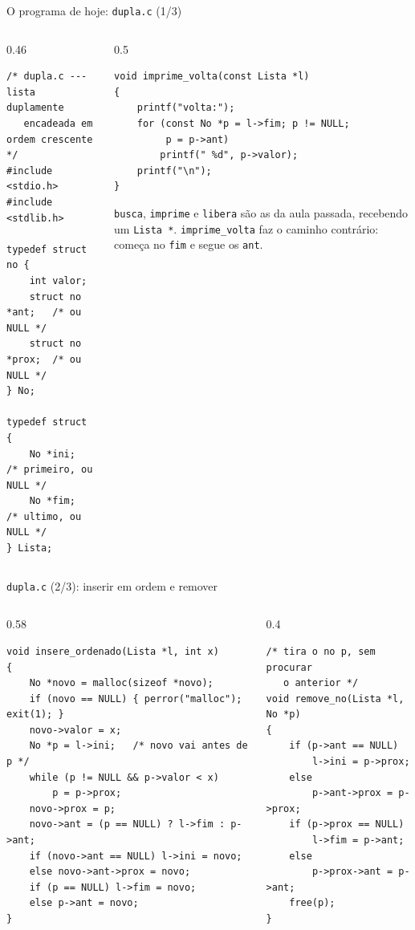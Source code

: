\documentclass[aspectratio=169]{beamer}
\begin{document}
\begin{frame}[fragile]{O programa de hoje: \texttt{dupla.c} (1/3)}
  \begin{columns}[T]
    \begin{column}{0.46\textwidth}
\begin{lstlisting}[style=codC]
/* dupla.c --- lista duplamente
   encadeada em ordem crescente */
#include <stdio.h>
#include <stdlib.h>

typedef struct no {
    int valor;
    struct no *ant;   /* ou NULL */
    struct no *prox;  /* ou NULL */
} No;

typedef struct {
    No *ini;   /* primeiro, ou NULL */
    No *fim;   /* ultimo, ou NULL */
} Lista;
\end{lstlisting}
    \end{column}
    \begin{column}{0.5\textwidth}
\begin{lstlisting}[style=codC]
void imprime_volta(const Lista *l)
{
    printf("volta:");
    for (const No *p = l->fim; p != NULL;
         p = p->ant)
        printf(" %d", p->valor);
    printf("\n");
}
\end{lstlisting}
      \small \texttt{busca}, \texttt{imprime} e \texttt{libera} são as da
      aula passada, recebendo um \texttt{Lista *}. \texttt{imprime\_volta}
      faz o caminho contrário: começa no \texttt{fim} e segue os
      \texttt{ant}.
    \end{column}
  \end{columns}
\end{frame}

\begin{frame}[fragile]{\texttt{dupla.c} (2/3): inserir em ordem e remover}
  \vspace{-0.5em}
  \begin{columns}[T]
    \begin{column}{0.58\textwidth}
\begin{lstlisting}[style=codC]
void insere_ordenado(Lista *l, int x)
{
    No *novo = malloc(sizeof *novo);
    if (novo == NULL) { perror("malloc"); exit(1); }
    novo->valor = x;
    No *p = l->ini;   /* novo vai antes de p */
    while (p != NULL && p->valor < x)
        p = p->prox;
    novo->prox = p;
    novo->ant = (p == NULL) ? l->fim : p->ant;
    if (novo->ant == NULL) l->ini = novo;
    else novo->ant->prox = novo;
    if (p == NULL) l->fim = novo;
    else p->ant = novo;
}
\end{lstlisting}
    \end{column}
    \begin{column}{0.4\textwidth}
\begin{lstlisting}[style=codC]
/* tira o no p, sem procurar
   o anterior */
void remove_no(Lista *l, No *p)
{
    if (p->ant == NULL)
        l->ini = p->prox;
    else
        p->ant->prox = p->prox;
    if (p->prox == NULL)
        l->fim = p->ant;
    else
        p->prox->ant = p->ant;
    free(p);
}
\end{lstlisting}
    \end{column}
  \end{columns}
\end{frame}
\end{document}
